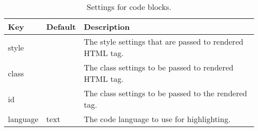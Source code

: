 \begin{table}
\center\caption{\label{code-settings}Settings for code blocks.}\par\begin{tabulary}{\textwidth}{LLL}
\toprule
Key &Default &Description \\
\midrule
style & &The style settings that are passed to rendered HTML tag. \\
class & &The class settings to be passed to rendered HTML tag. \\
id & &The class settings to be passed to the rendered tag. \\
language &text &The code language to use for highlighting. \\
\bottomrule
\end{tabulary}

\end{table}
